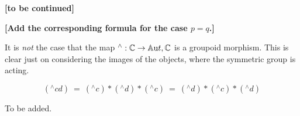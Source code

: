 \medskip\noindent
{\bf [to be continued]}

\newpage\noindent
{\bf [Add the corresponding formula for the case $p=q$.]}

\bigskip
It is \emph{not} the case that the map ${}^{\wedge} : \mathbb{C} \to \mathbb{A}{\mathrm ut},\mathbb{C}$ 
is a groupoid morphism. 
This is clear just on considering the images of the objects, 
where the symmetric group is acting.

\begin{lem}
$$
({}^{\wedge} cd) 
~=~ ({}^{\wedge} c)*({}^{\wedge} d)*({}^{\wedge} c) 
~=~ ({}^{\wedge} d)*({}^{\wedge} c)*({}^{\wedge} d) 
$$
\end{lem}
\begin{pf}
To be added.
\end{pf}


